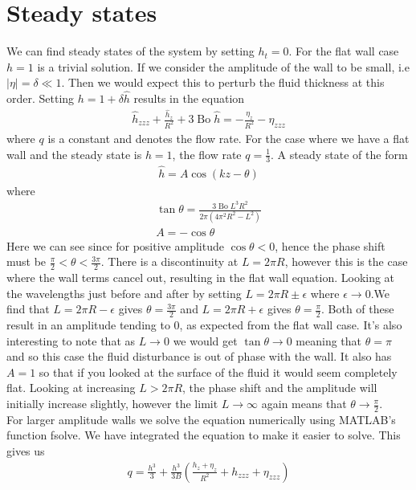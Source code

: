 \documentclass{jfm}
\DeclareMathOperator{\Bo}{Bo}
\begin{document}
\section{Steady states}
We can find steady states of the system by setting $h_t = 0$. For the flat wall case $h = 1$ is a trivial solution. If we consider the amplitude of the wall to be small, i.e $|\eta| = \delta \ll 1$. Then we would expect this to perturb the fluid thickness at this order. Setting $h = 1 + \delta \hat{h}$ results in the equation
\begin{align}
	\hat{h}_{zzz} +\frac{\hat{h}_z}{R^2}  + 3\Bo\hat{h} =  - \frac{\eta_z}{R^2} - \eta_{zzz}
\end{align}
where $q$ is a constant and denotes the flow rate. For the case where we have a flat wall and the steady state is $h = 1$, the flow rate $q = \frac{1}{3}$. A steady state of the form 
\begin{align}
\hat{h} = A \cos(kz - \theta) \label{smallh}
\end{align}
where 
\begin{align}
	\tan \theta = \frac{3\Bo L^3R^2}{2\pi(4\pi^2R^2-L^2)}\\
	A = -\cos \theta
\end{align}
Here we can see since for positive amplitude $\cos\theta<0$, hence the phase shift must be $\frac{\pi}{2}<\theta<\frac{3\pi}{2}$. There is a discontinuity at $L = 2\pi R$, however this is the case where the wall terms cancel out, resulting in the flat wall equation. Looking at the wavelengths just before and after by setting $L = 2\pi R \pm \epsilon$ where $\epsilon \to 0$.We find that $L = 2\pi R - \epsilon$ gives $\theta = \frac{3\pi}{2}$ and $L = 2\pi R + \epsilon$ gives $\theta = \frac{\pi}{2}$. Both of these result in an amplitude tending to 0, as expected from the flat wall case. It's also interesting to note that as $L\to 0 $ we would get $\tan \theta \to 0$ meaning that $\theta = \pi$ and so this case the fluid disturbance is out of phase with the wall. It also has $A = 1$ so that if you looked at the surface of the fluid it would seem completely flat. Looking at increasing $L>2\pi R$, the phase shift and the amplitude will initially increase slightly, however the limit $L\to \infty$ again means that $\theta\to \frac{\pi}{2}$.\\
For larger amplitude walls we solve the equation numerically using MATLAB's function fsolve. We have integrated the equation to make it easier to solve. This gives us
\begin{align}
 q = 	\frac{h^3}{3}  + \frac{h^3}{3B}\left(\frac{h_z+ \eta_z}{R^2} + h_{zzz}+ \eta_{zzz}\right)
\end{align}
\end{document}
